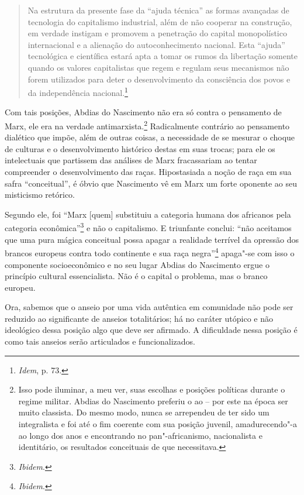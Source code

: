\begin{quote}
Na estrutura da presente fase da ``ajuda técnica'' as formas avançadas
de tecnologia do capitalismo industrial, além de não cooperar na
construção, em verdade instigam e promovem a penetração do capital
monopolístico internacional e a alienação do autoconhecimento nacional.
Esta ``ajuda'' tecnológica e científica estará apta a tomar os rumos da
libertação somente quando os valores capitalistas que regem e regulam
seus mecanismos não forem utilizados para deter o desenvolvimento da
consciência dos povos e da independência nacional.\footnote{\emph{Idem}, p. 73.}
\end{quote}


Com tais posições, Abdias do Nascimento não era só contra o pensamento
de Marx, ele era na verdade antimarxista.\footnote{Isso pode iluminar, a
  meu ver, suas escolhas e posições políticas durante o regime militar.
  Abdias do Nascimento preferiu o  ao  -- por este na época ser
  muito classista. Do mesmo modo, nunca se arrependeu de ter sido um
  integralista e foi até o fim coerente com sua posição juvenil,
  amadurecendo"-a ao longo dos anos e encontrando no pan"-africanismo,
  nacionalista e identitário, os resultados conceituais de que
  necessitava.} Radicalmente contrário ao pensamento dialético que
impõe, além de outras coisas, a necessidade de se mesurar o choque de
culturas e o desenvolvimento histórico destas em suas trocas; para ele
os intelectuais que partissem das análises de Marx fracassariam ao
tentar compreender o desenvolvimento das raças. Hipostasiada a noção de
raça em sua safra ``conceitual'', é óbvio que Nascimento vê em Marx um
forte oponente ao seu misticismo retórico.

Segundo ele, foi ``Marx {[}quem{]} substituiu a categoria humana dos
africanos pela categoria econômica''\footnote{\emph{Ibidem}.} e não o
capitalismo. E triunfante conclui: ``não aceitamos que uma pura mágica
conceitual possa apagar a realidade terrível da opressão dos brancos
europeus contra todo continente e sua raça negra''\footnote{\emph{Ibidem}.}
apaga"-se com isso o componente socioeconômico e no seu lugar Abdias do
Nascimento ergue o princípio cultural essencialista. Não é o capital o
problema, mas o branco europeu.

Ora, sabemos que o anseio por uma vida autêntica em comunidade não pode
ser reduzido ao significante de anseios totalitários; há no caráter
utópico e não ideológico dessa posição algo que deve ser afirmado. A
dificuldade nessa posição é como tais anseios serão articulados e
funcionalizados.

